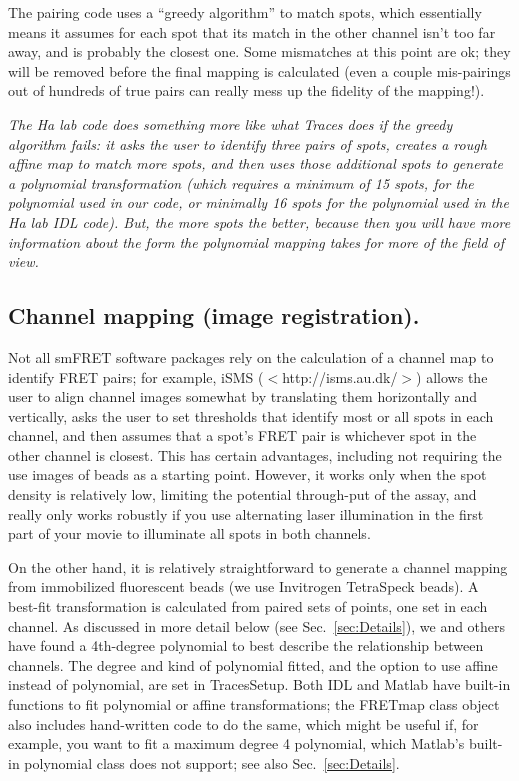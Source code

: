 \documentclass[11pt]{article}
\begin{document}
The pairing code uses a ``greedy algorithm'' to match spots, which essentially means it assumes for each spot that its match in the other channel isn't too far away, and is probably the closest one.  Some mismatches at this point are ok; they will be removed before the final mapping is calculated (even a couple mis-pairings out of hundreds of true pairs can really mess up the fidelity of the mapping!).

{\it The Ha lab code does something more like what Traces does if the greedy algorithm fails: it asks the user to identify three pairs of spots, creates a rough affine map to match more spots, and then uses those additional spots to generate a polynomial transformation (which requires a minimum of 15 spots, for the polynomial used in our code, or minimally 16 spots for the polynomial used in the Ha lab IDL code).  But, the more spots the better, because then you will have more information about the form the polynomial mapping takes for more of the field of view.}

\subsection{Channel mapping (image registration).}\label{sec:ExplainingMapping}

Not all smFRET software packages rely on the calculation of a channel map to identify FRET pairs; for example, iSMS ($<$http://isms.au.dk/$>$) allows the user to align channel images somewhat by translating them horizontally and vertically, asks the user to set thresholds that identify most or all spots in each channel, and then assumes that a spot's FRET pair is whichever spot in the other channel is closest. This has certain advantages, including not requiring the use images of beads as a starting point. However, it works only when the spot density is relatively low, limiting the potential through-put of the assay, and really only works robustly if you use alternating laser illumination in the first part of your movie to illuminate all spots in both channels.

On the other hand, it is relatively straightforward to generate a channel mapping from immobilized fluorescent beads (we use Invitrogen TetraSpeck beads).  A best-fit transformation is calculated from paired sets of points, one set in each channel.  As discussed in more detail below (see Sec.~\ref{sec:Details}), we and others have found a 4th-degree polynomial to best describe the relationship between channels.  The degree and kind of polynomial fitted, and the option to use affine instead of polynomial, are set in TracesSetup.  Both IDL and Matlab have built-in functions to fit polynomial or affine transformations; the FRETmap class object also includes hand-written code to do the same, which might be useful if, for example, you want to fit a maximum degree 4 polynomial, which Matlab's built-in polynomial class does not support; see also Sec.~\ref{sec:Details}.
\end{document}
